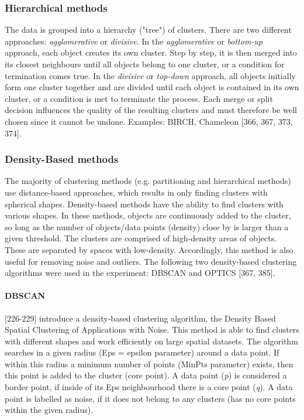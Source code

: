   \subsubsection{Hierarchical methods}
  The data is grouped into a hierarchy ("tree") of clusters. There are two different approaches: \textit{agglomerative} or \textit{divisive}. In the \textit{agglomerative} or \textit{bottom-up} approach, each object creates its own cluster. Step by step, it is then merged into its closest neighbours until all objects belong to one cluster, or a condition for termination comes true. In the \textit{divisive} or \textit{top-down} approach, all objects initially form one cluster together and are divided until each object is contained in its own cluster, or a condition is met to terminate the process. Each merge or split decision influences the quality of the resulting clusters and must therefore be well chosen since it cannot be undone. Examples: BIRCH, Chameleon \autocite{han2011data}[366, 367, 373, 374].


  \subsubsection{Density-Based methods}
  \label{section:densityBasedMethods}
  The majority of clustering methods (e.g. partitioning and hierarchical methods) use distance-based approaches, which results in only finding clusters with spherical shapes. Density-based methods have the ability to find clusters with various shapes. In these methods, objects are continuously added to the cluster, so long as the number of objects/data points (density) close by is larger than a given threshold. The clusters are comprised of high-density areas of objects. These are separated by spaces with low-density. Accordingly, this method is also useful for removing noise and outliers. The following two density-based clustering algorithms were used in the experiment: DBSCAN and OPTICS \autocite{han2011data}[367, 385].
  

\paragraph{DBSCAN}
\label{section:DBSCAN}
\textcite{DBSCAN}[226-229] introduce a density-based clustering algorithm, the Density Based Spatial Clustering of Applications with Noise. This method is able to find clusters with different shapes and work efficiently on large spatial datasets. The algorithm searches in a given radius (Eps = epsilon parameter) around a data point. If within this radius a minimum number of points (MinPts parameter) exists, then this point is added to the cluster (core point). A data point (\textit{p}) is considered a border point, if inside of its Eps neighbourhood there is a core point (\textit{q}). A data point is labelled as noise, if it does not belong to any clusters (has no core points within the given radius). 

